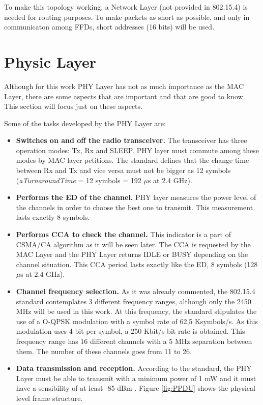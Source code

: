 To make this topology working, a Network Layer (not provided in 802.15.4) is needed for routing purposes. To make packets as short as possible,
and only in communicaton among \acp{FFD}, short addresses (16 bits) will be used.

\section{Physic Layer}

Although for this work \ac{PHY} Layer has not as much importance as the \ac{MAC} Layer, there are some aspects that are important and 
that are good to know. This section will focus just on these aspects.

Some of the tasks developed by the \ac{PHY} Layer are:

\begin{itemize}
 \item \textbf{Switches on and off the radio transceiver.} The transceiver has three operation modes: \ac{Tx}, \ac{Rx} and SLEEP. \ac{PHY}
layer must commute among these modes by \ac{MAC} layer petitions. The standard defines that the change time between \ac{Rx} and 
\ac{Tx} and vice versa must not be bigger as 12 symbols (\textit{aTurnaroundTime} = 12 symbols = 192 $\mu$s at 2.4 GHz).
 \item \textbf{Performs the \ac{ED} of the channel.} \ac{PHY} layer measures the power level of the channels in order to choose the best one
to transmit. This measurement lasts exactly 8 symbols.
 \item \textbf{Performs \ac{CCA} to check the channel.} This indicator is a part of \ac{CSMA/CA} algorithm as it will be seen later. The
\ac{CCA} is requested by the \ac{MAC} Layer and the \ac{PHY} Layer returns IDLE or BUSY depending on the channel situation. This \ac{CCA}
period lasts exactly like the \ac{ED}, 8 symbols (128 $\mu$s at 2.4 GHz).
 \item \textbf{Channel frequency selection.} As it was already commented, the 802.15.4 standard contemplates 3 different frequency 
ranges, although only the 2450 MHz will be used in this work. At this frequency, the standard stipulates 
the use of a \ac{O-QPSK} modulation with a symbol rate of 62,5 Ksymbols/s. As this modulation uses 4 bit per symbol, 
a 250 Kbit/s bit rate is obtained. This frequency range has 16 different channels with a 5 MHz separation between them. The number of 
these channels goes from 11 to 26.
 \item \textbf{Data transmission and reception.} According to the standard, the \ac{PHY} Layer must be able to transmit with a minimum
power of 1 mW and it must have a sensibility of at least -85 dBm \cite{IEEE802.15.4-2006}. Figure \ref{fig:PPDU} shows the physical level frame structure.


\end{itemize}
